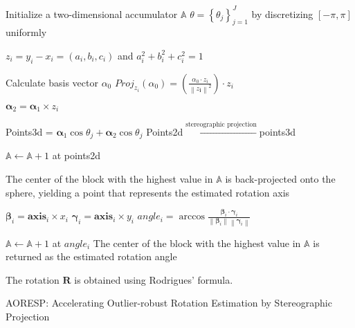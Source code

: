 \begin{algorithm}[t]
    \DontPrintSemicolon
    \BlankLine
    
    Initialize a two-dimensional accumulator $\mathbb{A}$\;
    $\theta = \left \{ \theta _{j}  \right \} _{j=1}^{J}$ by discretizing $\left [ -\pi ,\pi  \right ]$  uniformly\;

    {
    
    $\bm{\mathit{z}}_{i} = \bm{\mathit{y}}_{i}-\bm{\mathit{x}}_{i} = \left ( \bm{\mathit{a}}_{i} , \bm{\mathit{b }}_{i},\bm{\mathit{c}}_{i} \right )$ and $\bm{\mathit{a}}_{i}^{2}+\bm{\mathit{b}}_{i}^{2}+\bm{\mathit{c}}_{i}^{2}=1$\;

    Calculate basis vector $\alpha _{0} $\;
    $Proj_{\bm{\mathit{z}}_{i}} \left ( \alpha _{0} \right ) =\left ( \frac{\alpha _{0}\cdot \bm{\mathit{z}}_{i}}{\left \| \bm{\bm{\mathit{z}}_{i}} \right \|^{2}}\right )\cdot \bm{\mathit{z}}_{i}$\;

    $\bm{\alpha}_{2}=\bm{\alpha}_{1}\times\bm{\mathit{z}}_{i}$\;

    Points3d = $\bm{\alpha}_{1}\cos\theta _{j} + \bm{\alpha}_{2}\cos\theta _{j}$\;
    Points2d$\xleftarrow{\text{stereographic projection}}$points3d\;
    
    $\mathbb{A} \longleftarrow \mathbb{A} + 1$ at points2d\;

    The center of the block with the highest value in $\mathbb{A}$ is back-projected onto the sphere, yielding a point that represents the estimated rotation axis\;

    {
    $\bm{\beta}_{i} = \bm{axis}_{i}\times  \bm{\mathit{x}}_{i}$\;
    $\bm{\gamma}_{i} = \bm{axis}_{i}\times \bm{\mathit{y}}_{i}$\;
    $ angle_{i} = \arccos \frac{\bm{\beta}_{i} \cdot \bm{\gamma}_{i} }{\left \| \bm{\beta}_{i} \right \|\left \| \bm{\gamma}_{i} \right \| }$\;
    
    $\mathbb{A} \longleftarrow \mathbb{A} + 1$ at $angle_{i}$\;
    The center of the block with the highest value in $\mathbb{A}$ is returned as the estimated rotation angle\;
    } 
    }
    The rotation $\mathbf{R} $ is obtained using Rodrigues' formula.

    \caption{AORESP: Accelerating Outlier-robust Rotation Estimation by
Stereographic Projection}

\end{algorithm}